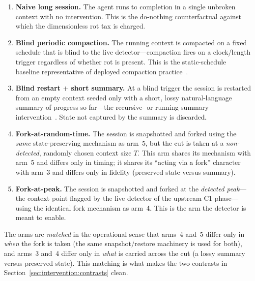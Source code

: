 \begin{enumerate}
  \item \textbf{Naive long session.} The agent runs to completion in a single
        unbroken context with no intervention. This is the do-nothing
        counterfactual against which the dimensionless rot tax is charged.

  \item \textbf{Blind periodic compaction.} The running context is compacted on
        a fixed schedule that is blind to the live detector---compaction fires
        on a clock/length trigger regardless of whether rot is present. This is
        the static-schedule baseline representative of deployed compaction
        practice~\cite{rajasekaran2025contextengineering,yan2025dontbuild}.

  \item \textbf{Blind restart $+$ short summary.} At a blind trigger the session
        is restarted from an empty context seeded only with a short,
        lossy natural-language summary of progress so far---the recursive- or
        running-summary intervention~\cite{wang2023recursive}. State not
        captured by the summary is discarded.

  \item \textbf{Fork-at-random-time.} The session is snapshotted and forked
        using the \emph{same} state-preserving mechanism as arm~5, but the cut
        is taken at a \emph{non-detected}, randomly chosen context size $T$.
        This arm shares its mechanism with arm~5 and differs only in timing;
        it shares its ``acting via a fork'' character with arm~3 and differs
        only in fidelity (preserved state versus summary).

  \item \textbf{Fork-at-peak.} The session is snapshotted and forked at the
        \emph{detected peak}---the context point flagged by the live detector
        of the upstream C1 phase---using the identical fork mechanism as
        arm~4. This is the arm the detector is meant to enable.
\end{enumerate}

The arms are \emph{matched} in the operational sense that arms~4 and~5 differ
only in \emph{when} the fork is taken (the same snapshot/restore machinery is
used for both), and arms~3 and~4 differ only in \emph{what} is carried across
the cut (a lossy summary versus preserved state). This matching is what makes
the two contrasts in Section~\ref{sec:intervention:contrasts} clean.

